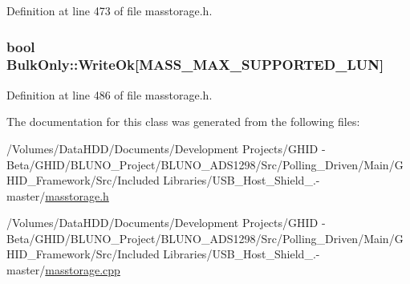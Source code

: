 \-Definition at line 473 of file masstorage.\-h.

\hypertarget{class_bulk_only_af763ffffdd131949322d583fb4cd2737}{
\subsubsection[{\-Write\-Ok}]{\setlength{\rightskip}{0pt plus 5cm}bool {\bf \-Bulk\-Only\-::\-Write\-Ok}\mbox{[}\-M\-A\-S\-S\-\_\-\-M\-A\-X\-\_\-\-S\-U\-P\-P\-O\-R\-T\-E\-D\-\_\-\-L\-U\-N\mbox{]}}}\label{class_bulk_only_af763ffffdd131949322d583fb4cd2737}


\-Definition at line 486 of file masstorage.\-h.



\-The documentation for this class was generated from the following files\-:\begin{DoxyCompactItemize}
\item 
/\-Volumes/\-Data\-H\-D\-D/\-Documents/\-Development Projects/\-G\-H\-I\-D -\/ Beta/\-G\-H\-I\-D/\-B\-L\-U\-N\-O\-\_\-\-Project/\-B\-L\-U\-N\-O\-\_\-\-A\-D\-S1298/\-Src/\-Polling\-\_\-\-Driven/\-Main/\-G\-H\-I\-D\-\_\-\-Framework/\-Src/\-Included Libraries/\-U\-S\-B\-\_\-\-Host\-\_\-\-Shield\-\_.-\/master/\hyperlink{masstorage_8h}{masstorage.\-h}\item 
/\-Volumes/\-Data\-H\-D\-D/\-Documents/\-Development Projects/\-G\-H\-I\-D -\/ Beta/\-G\-H\-I\-D/\-B\-L\-U\-N\-O\-\_\-\-Project/\-B\-L\-U\-N\-O\-\_\-\-A\-D\-S1298/\-Src/\-Polling\-\_\-\-Driven/\-Main/\-G\-H\-I\-D\-\_\-\-Framework/\-Src/\-Included Libraries/\-U\-S\-B\-\_\-\-Host\-\_\-\-Shield\-\_.-\/master/\hyperlink{masstorage_8cpp}{masstorage.\-cpp}\end{DoxyCompactItemize}
